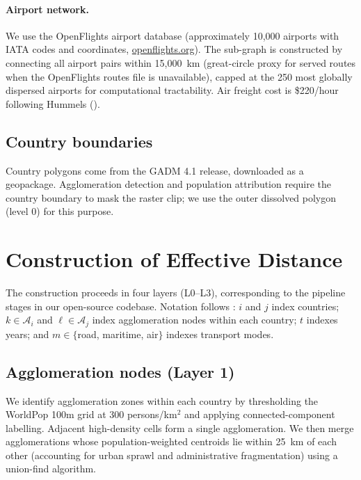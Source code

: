 \documentclass[11pt, a4paper]{article}
\begin{document}
\paragraph{Airport network.}
We use the OpenFlights airport database (approximately 10{,}000 airports with
IATA codes and coordinates, \url{openflights.org}).  The sub-graph is
constructed by connecting all airport pairs within 15{,}000~km (great-circle
proxy for served routes when the OpenFlights routes file is unavailable), capped
at the 250 most globally dispersed airports for computational tractability.
Air freight cost is \$220/hour following Hummels (\citeyear{hummels_2007}).

\subsection{Country boundaries}
\label{sec:data:boundaries}

Country polygons come from the GADM 4.1 release, downloaded as a geopackage.
Agglomeration detection and population attribution require the country
boundary to mask the raster clip; we use the outer dissolved polygon (level 0)
for this purpose.

\section{Construction of Effective Distance}
\label{sec:construction}

The construction proceeds in four layers (L0--L3), corresponding to the
pipeline stages in our open-source codebase.  Notation follows
\citet{head_mayer_2002}: $i$ and $j$ index countries; $k \in \mathcal{A}_i$
and $\ell \in \mathcal{A}_j$ index agglomeration nodes within each country;
$t$ indexes years; and $m \in \{$road, maritime, air$\}$ indexes transport
modes.

\subsection{Agglomeration nodes (Layer 1)}
\label{sec:construction:agglom}

We identify agglomeration zones within each country by thresholding the
WorldPop 100m grid at 300 persons/km$^2$ and applying connected-component
labelling.  Adjacent high-density cells form a single agglomeration.  We then
merge agglomerations whose population-weighted centroids lie within 25~km of
each other (accounting for urban sprawl and administrative fragmentation)
using a union-find algorithm.
\end{document}
